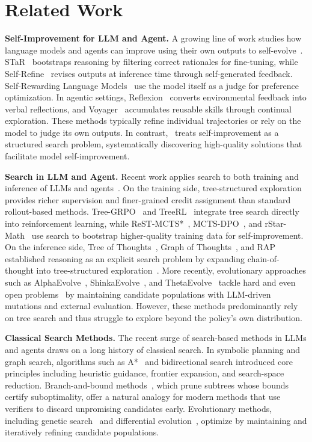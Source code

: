 \section{Related Work}

\textbf{Self-Improvement for LLM and Agent.} A growing line of work studies how language models and agents can improve using their own outputs to self-evolve~\citep{selfimprovement, selftraining}. STaR~\citep{star} bootstraps reasoning by filtering correct rationales for fine-tuning, while Self-Refine~\citep{madaan2023self} revises outputs at inference time through self-generated feedback. Self-Rewarding Language Models~\citep{selfreward} use the model itself as a judge for preference optimization. In agentic settings, Reflexion~\citep{shinn2023reflexion} converts environmental feedback into verbal reflections, and Voyager~\citep{wang2023voyager} accumulates reusable skills through continual exploration. These methods typically refine individual trajectories or rely on the model to judge its own outputs. In contrast, \ours\ treats self-improvement as a structured search problem, systematically discovering high-quality solutions that facilitate model self-improvement.

\textbf{Search in LLM and Agent.} Recent work applies search to both training and inference of LLMs and agents~\citep{efficientevolution, funsearch}. On the training side, tree-structured exploration provides richer supervision and finer-grained credit assignment than standard rollout-based methods. Tree-GRPO~\citep{treegrpo} and TreeRL~\citep{treerl} integrate tree search directly into reinforcement learning, while ReST-MCTS*~\citep{restmcts}, MCTS-DPO~\citep{mctsdpo}, and rStar-Math~\citep{rstarmath} use search to bootstrap higher-quality training data for self-improvement. On the inference side, Tree of Thoughts~\citep{tot}, Graph of Thoughts~\citep{got}, and RAP~\citep{rap} established reasoning as an explicit search problem by expanding chain-of-thought into tree-structured exploration~\citep{abmcts}. More recently, evolutionary approaches such as AlphaEvolve~\citep{alphaevolve}, ShinkaEvolve~\citep{shinkaevolve}, and ThetaEvolve~\citep{thetaevolve} tackle hard and even open problems~\citep{languageevolutionary} by maintaining candidate populations with LLM-driven mutations and external evaluation. However, these methods predominantly rely on tree search and thus struggle to explore beyond the policy's own distribution.

\textbf{Classical Search Methods.} The recent surge of search-based methods in LLMs and agents draws on a long history of classical search. In symbolic planning and graph search, algorithms such as A*~\citep{astar} and bidirectional search introduced core principles including heuristic guidance, frontier expansion, and search-space reduction. Branch-and-bound methods~\citep{bbsurvey}, which prune subtrees whose bounds certify suboptimality, offer a natural analogy for modern methods that use verifiers to discard unpromising candidates early. Evolutionary methods, including genetic search~\citep{genesearch,geneprogram} and differential evolution~\citep{differentialevolution}, optimize by maintaining and iteratively refining candidate populations. 
